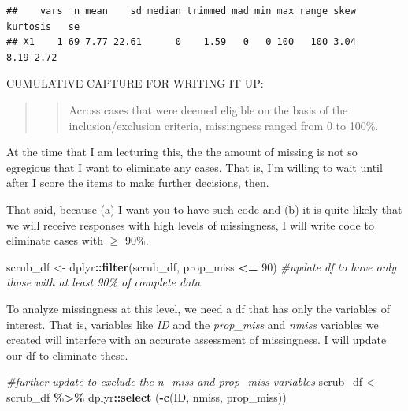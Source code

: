 \documentclass[
  11pt,
]{book}
\newenvironment{Shaded}{\begin{snugshade}}{\end{snugshade}}
\newcommand{\CommentTok}[1]{\textcolor[rgb]{0.37,0.37,0.37}{\textit{#1}}}
\newcommand{\DecValTok}[1]{\textcolor[rgb]{0.06,0.06,0.06}{#1}}
\newcommand{\FunctionTok}[1]{\textcolor[rgb]{0.27,0.27,0.27}{\textbf{#1}}}
\newcommand{\NormalTok}[1]{#1}
\newcommand{\OtherTok}[1]{\textcolor[rgb]{0.37,0.37,0.37}{#1}}
\newcommand{\SpecialCharTok}[1]{\textcolor[rgb]{0.43,0.43,0.43}{\textbf{#1}}}
\begin{document}
\begin{verbatim}
##    vars  n mean    sd median trimmed mad min max range skew kurtosis   se
## X1    1 69 7.77 22.61      0    1.59   0   0 100   100 3.04     8.19 2.72
\end{verbatim}

CUMULATIVE CAPTURE FOR WRITING IT UP:

\begin{quote}
\begin{quote}
Across cases that were deemed eligible on the basis of the inclusion/exclusion criteria, missingness ranged from 0 to 100\%.
\end{quote}
\end{quote}

At the time that I am lecturing this, the the amount of missing is not so egregious that I want to eliminate any cases. That is, I'm willing to wait until after I score the items to make further decisions, then.

That said, because (a) I want you to have such code and (b) it is quite likely that we will receive responses with high levels of missingness, I will write code to eliminate cases with \(\geq\) 90\%.

\begin{Shaded}
\begin{Highlighting}[]
\NormalTok{scrub\_df }\OtherTok{\textless{}{-}}\NormalTok{ dplyr}\SpecialCharTok{::}\FunctionTok{filter}\NormalTok{(scrub\_df, prop\_miss }\SpecialCharTok{\textless{}=} \DecValTok{90}\NormalTok{)  }\CommentTok{\#update df to have only those with at least 90\% of complete data}
\end{Highlighting}
\end{Shaded}

To analyze missingness at this level, we need a df that has only the variables of interest. That is, variables like \emph{ID} and the \emph{prop\_miss} and \emph{nmiss} variables we created will interfere with an accurate assessment of missingness. I will update our df to eliminate these.

\begin{Shaded}
\begin{Highlighting}[]
\CommentTok{\#further update to exclude the n\_miss and prop\_miss variables}
\NormalTok{scrub\_df }\OtherTok{\textless{}{-}}\NormalTok{ scrub\_df }\SpecialCharTok{\%\textgreater{}\%}
\NormalTok{  dplyr}\SpecialCharTok{::}\FunctionTok{select}\NormalTok{ (}\SpecialCharTok{{-}}\FunctionTok{c}\NormalTok{(ID, nmiss, prop\_miss))}
\end{Highlighting}
\end{Shaded}
\end{document}
